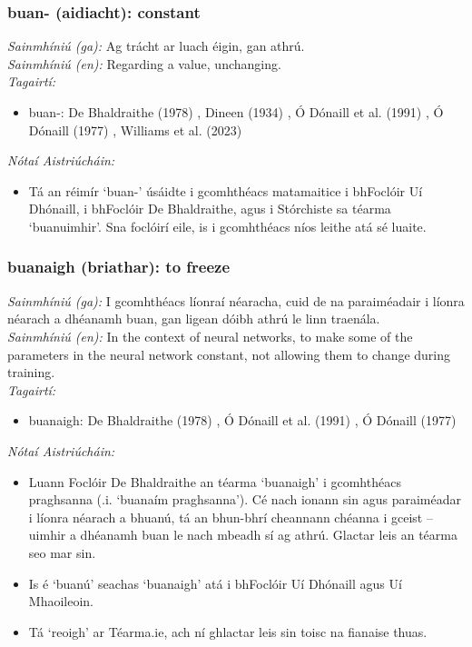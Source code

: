\subsubsection*{buan- (aidiacht): constant}
 \noindent \textit{Sainmhíniú (ga):} Ag trácht ar luach éigin, gan athrú.
\\
 \noindent \textit{Sainmhíniú (en):} Regarding a value, unchanging.
\\
 \noindent \textit{Tagairtí:}
\begin{itemize}
	\item buan-: De Bhaldraithe (1978) \cite{de-bhaldraithe}, Dineen (1934) \cite{dineen}, Ó Dónaill et al. (1991) \cite{focloir-beag}, Ó Dónaill (1977) \cite{odonaill}, Williams et al. (2023) \cite{storchiste}
\end{itemize}

 \noindent \textit{Nótaí Aistriúcháin:}
\begin{itemize}
	\item Tá an réimír `buan-' úsáidte i gcomhthéacs matamaitice i bhFoclóir Uí Dhónaill, i bhFoclóir De Bhaldraithe, agus i Stórchiste sa téarma `buanuimhir'. Sna foclóirí eile, is i gcomhthéacs níos leithe atá sé luaite.
\end{itemize}


\subsubsection*{buanaigh (briathar): to freeze}
 \noindent \textit{Sainmhíniú (ga):} I gcomhthéacs líonraí néaracha, cuid de na paraiméadair i líonra néarach a dhéanamh buan, gan ligean dóibh athrú le linn traenála.
\\
 \noindent \textit{Sainmhíniú (en):} In the context of neural networks, to make some of the parameters in the neural network constant, not allowing them to change during training.
\\
 \noindent \textit{Tagairtí:}
\begin{itemize}
	\item buanaigh: De Bhaldraithe (1978) \cite{de-bhaldraithe}, Ó Dónaill et al. (1991) \cite{focloir-beag}, Ó Dónaill (1977) \cite{odonaill}
\end{itemize}

 \noindent \textit{Nótaí Aistriúcháin:}
\begin{itemize}
	\item Luann Foclóir De Bhaldraithe an téarma `buanaigh' i gcomhthéacs praghsanna (.i. `buanaím praghsanna'). Cé nach ionann sin agus paraiméadar i líonra néarach a bhuanú, tá an bhun-bhrí cheannann chéanna i gceist -- uimhir a dhéanamh buan le nach mbeadh sí ag athrú. Glactar leis an téarma seo mar sin.
	\item Is é `buanú' seachas `buanaigh' atá i bhFoclóir Uí Dhónaill agus Uí Mhaoileoin.
	\item Tá `reoigh' ar Téarma.ie, ach ní ghlactar leis sin toisc na fianaise thuas.
\end{itemize}


